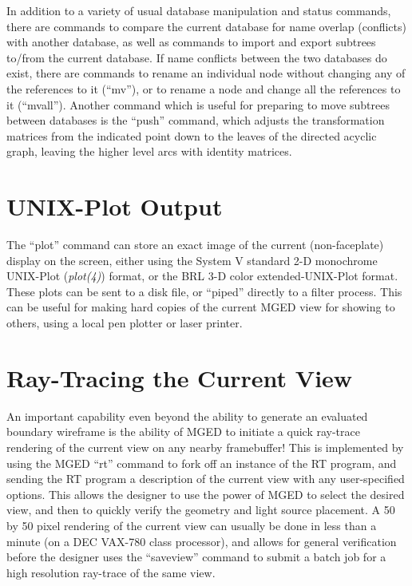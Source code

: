 In addition to a variety of usual database manipulation
and status commands, there are commands to
compare the current database for name overlap (conflicts)
with another database, as well as commands to import and export
subtrees to/from the current database.
If name conflicts between the two databases
do exist, there are commands to rename an individual node without
changing any of the references to it (``mv''), or to rename
a node and change all the references to it (``mvall'').
Another command which is useful for preparing to move subtrees between
databases is the ``push'' command,
which adjusts the transformation matrices from the indicated point
down to the leaves of the directed acyclic graph, leaving the higher
level arcs with identity matrices.

\section{UNIX-Plot Output}

The ``plot'' command can store an exact image of the current
(non-faceplate) display on the screen, either using the
System V standard 2-D monochrome UNIX-Plot ({\em plot(4)}) format,
or the BRL 3-D color extended-UNIX-Plot format.
These plots can be sent to a disk file,
or ``piped'' directly to a filter process.
This can be useful for making hard copies of the current MGED view
for showing to others,
using a local pen plotter or laser printer.

\section{Ray-Tracing the Current View}

An important capability even beyond the ability to generate an
evaluated boundary wireframe is the ability of MGED to initiate a
quick ray-trace rendering of the current view on any nearby framebuffer!
This is implemented by using the MGED ``rt'' command to fork off
an instance of the RT program, and sending the RT program
a description of the current view
with any user-specified options.
This allows the designer to
use the power of MGED to select the desired view, and then to
quickly verify the geometry and light source placement.
A 50 by 50 pixel rendering of the current view can usually be done
in less than a minute (on a DEC VAX-780 class processor), and allows
for general verification before the designer uses the ``saveview''
command to submit a batch job for a high resolution ray-trace of
the same view.

